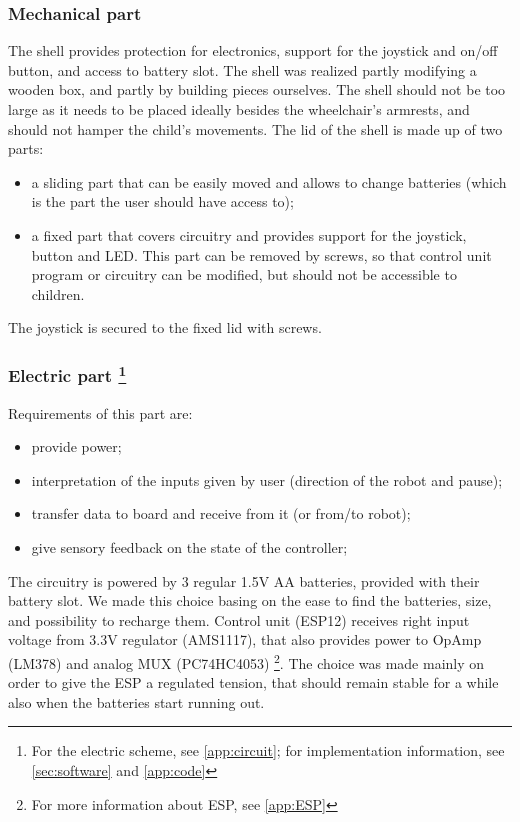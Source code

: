 \documentclass[a4paper,twoside]{book}
\begin{document}
\subsubsection{Mechanical part}

The shell provides protection for electronics, support for the joystick and on/off button, and access to battery slot. The shell was realized partly modifying a wooden box, and partly by building pieces ourselves. The shell should not be too large as it needs to be placed ideally besides the wheelchair's armrests, and should not hamper the child's movements.
The lid of the shell is made up of two parts:

\begin{itemize}
\item a sliding part that can be easily moved and allows to change batteries (which is the part the user should have access to);
\item a fixed part that covers circuitry and provides support for the joystick, button and LED. This part can be removed by screws, so that control unit program or circuitry can be modified, but should not be accessible to children.
\end{itemize}
The joystick is secured to the fixed lid with screws.

\subsubsection[Electric part]{Electric part \footnote{For the electric scheme, see \autoref{app:circuit}; for implementation information, see \autoref{sec:software} and \autoref{app:code}}}
Requirements of this part are: 
\begin{itemize}
\item provide power;
\item interpretation of the inputs given by user (direction of the robot and pause);
\item transfer data to board and receive from it (or from/to robot);
\item give sensory feedback on the state of the controller;
\end{itemize}
The circuitry is powered by 3 regular 1.5V AA batteries, provided with their battery slot. We made this choice basing on the ease to find the batteries, size, and possibility to recharge them. Control unit (ESP12) receives right input voltage from 3.3V regulator (AMS1117), that also provides power to Op\textendash Amp (LM378) and analog MUX (PC74HC4053)
\footnote{For more information about ESP, see \autoref{app:ESP}}.
The choice was made mainly on order to give the ESP a regulated tension, that should remain stable for a while also when the batteries start running out.
\end{document}
